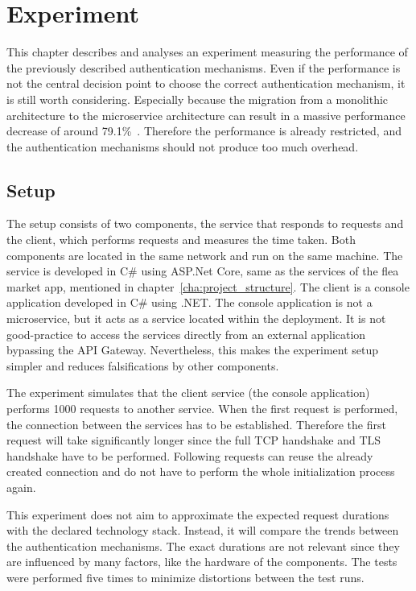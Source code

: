 \chapter{Experiment}
\label{cha:experiment}
This chapter describes and analyses an experiment measuring the performance of the previously described authentication mechanisms.
Even if the performance is not the central decision point to choose the correct authentication mechanism, it is still worth considering.
Especially because the migration from a monolithic architecture to the microservice architecture can result in a massive performance decrease of around 79.1\%~\cite{ueda2016workload}.
Therefore the performance is already restricted, and the authentication mechanisms should not produce too much overhead.

\section{Setup}
The setup consists of two components, the service that responds to requests and the client, which performs requests and measures the time taken.
Both components are located in the same network and run on the same machine.
The service is developed in C\# using ASP.Net Core, same as the services of the flea market app, mentioned in chapter~\ref{cha:project_structure}.
The client is a console application developed in C\# using .NET.
The console application is not a microservice, but it acts as a service located within the deployment.
It is not good-practice to access the services directly from an external application bypassing the API Gateway.
Nevertheless, this makes the experiment setup simpler and reduces falsifications by other components. 

The experiment simulates that the client service (the console application) performs 1000 requests to another service.
When the first request is performed, the connection between the services has to be established.
Therefore the first request will take significantly longer since the full TCP handshake and TLS handshake have to be performed.
Following requests can reuse the already created connection and do not have to perform the whole initialization process again.

This experiment does not aim to approximate the expected request durations with the declared technology stack.
Instead, it will compare the trends between the authentication mechanisms.
The exact durations are not relevant since they are influenced by many factors, like the hardware of the components.
The tests were performed five times to minimize distortions between the test runs.

